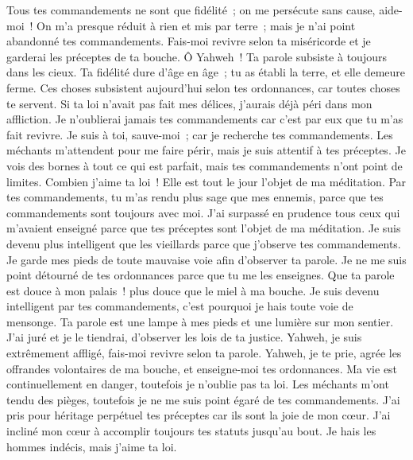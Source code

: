 \begin{multicols}{2}
Tous tes commandements ne sont que fidélité~; on me persécute sans cause, aide-moi~!
On m'a presque réduit à rien et mis par terre~; mais je n'ai point abandonné tes commandements.
Fais-moi revivre selon ta miséricorde et je garderai les préceptes de ta bouche.
 Ô Yahweh~! Ta parole subsiste à toujours dans les cieux.
Ta fidélité dure d'âge en âge~; tu as établi la terre, et elle demeure ferme.
Ces choses subsistent aujourd'hui selon tes ordonnances, car toutes choses te servent.
Si ta loi n'avait pas fait mes délices, j'aurais déjà péri dans mon affliction.
Je n'oublierai jamais tes commandements car c'est par eux que tu m'as fait revivre.
Je suis à toi, sauve-moi~; car je recherche tes commandements.
Les méchants m'attendent pour me faire périr, mais je suis attentif à tes préceptes.
Je vois des bornes à tout ce qui est parfait, mais tes commandements n'ont point de limites.
 Combien j'aime ta loi~! Elle est tout le jour l'objet de ma méditation.
Par tes commandements, tu m'as rendu plus sage que mes ennemis, parce que tes commandements sont toujours avec moi.
J'ai surpassé en prudence tous ceux qui m'avaient enseigné parce que tes préceptes sont l'objet de ma méditation.
Je suis devenu plus intelligent que les vieillards parce que j'observe tes commandements.
Je garde mes pieds de toute mauvaise voie afin d'observer ta parole.
Je ne me suis point détourné de tes ordonnances parce que tu me les enseignes.
Que ta parole est douce à mon palais~! plus douce que le miel à ma bouche.
Je suis devenu intelligent par tes commandements, c'est pourquoi je hais toute voie de mensonge.
 Ta parole est une lampe à mes pieds et une lumière sur mon sentier.
J'ai juré et je le tiendrai, d'observer les lois de ta justice.
Yahweh, je suis extrêmement affligé, fais-moi revivre selon ta parole.
Yahweh, je te prie, agrée les offrandes volontaires de ma bouche, et enseigne-moi tes ordonnances.
Ma vie est continuellement en danger, toutefois je n'oublie pas ta loi.
Les méchants m'ont tendu des pièges, toutefois je ne me suis point égaré de tes commandements.
J'ai pris pour héritage perpétuel tes préceptes car ils sont la joie de mon cœur.
J'ai incliné mon cœur à accomplir toujours tes statuts jusqu'au bout.
 Je hais les hommes indécis, mais j'aime ta loi.

\end{multicols}
